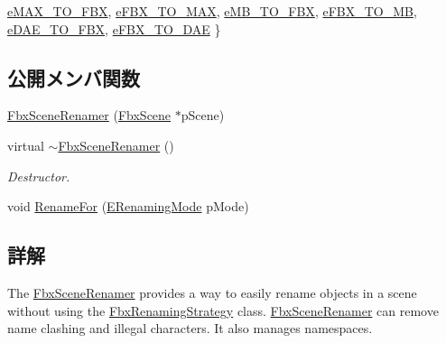 \begin{DoxyCompactItemize}
\newline
\hyperlink{class_fbx_scene_renamer_a9279ee1a645d6499b934adbc376f8678a78cd01354aa873a50104cacfc3f15ee1}{e\+M\+A\+X\+\_\+\+T\+O\+\_\+\+F\+BX}, 
\hyperlink{class_fbx_scene_renamer_a9279ee1a645d6499b934adbc376f8678ad35417f5b8fa1aebae49dd0b5768361e}{e\+F\+B\+X\+\_\+\+T\+O\+\_\+\+M\+AX}, 
\hyperlink{class_fbx_scene_renamer_a9279ee1a645d6499b934adbc376f8678a1ccbaac20ac59c6a17b02080b5b2ce42}{e\+M\+B\+\_\+\+T\+O\+\_\+\+F\+BX}, 
\hyperlink{class_fbx_scene_renamer_a9279ee1a645d6499b934adbc376f8678a4b2ce21a08c3ca1b33561dc9af4db009}{e\+F\+B\+X\+\_\+\+T\+O\+\_\+\+MB}, 
\newline
\hyperlink{class_fbx_scene_renamer_a9279ee1a645d6499b934adbc376f8678aeaaa82337096e368fac6bd8540b91d9e}{e\+D\+A\+E\+\_\+\+T\+O\+\_\+\+F\+BX}, 
\hyperlink{class_fbx_scene_renamer_a9279ee1a645d6499b934adbc376f8678a60b9c2ff84f2c16aa1311608b96c198e}{e\+F\+B\+X\+\_\+\+T\+O\+\_\+\+D\+AE}
 \}
\end{DoxyCompactItemize}
\subsection*{公開メンバ関数}
\begin{DoxyCompactItemize}
\item 
\hyperlink{class_fbx_scene_renamer_acb44c3ef9f338d6f55b57882505d9edb}{Fbx\+Scene\+Renamer} (\hyperlink{class_fbx_scene}{Fbx\+Scene} $\ast$p\+Scene)
\item 
virtual \hyperlink{class_fbx_scene_renamer_a68ee26ac24c461b9b11085feec2094f4}{$\sim$\+Fbx\+Scene\+Renamer} ()
\begin{DoxyCompactList}\small\item\em Destructor. \end{DoxyCompactList}\item 
void \hyperlink{class_fbx_scene_renamer_a08a9c3b587efe5422bd5b79f01b42e6d}{Rename\+For} (\hyperlink{class_fbx_scene_renamer_a9279ee1a645d6499b934adbc376f8678}{E\+Renaming\+Mode} p\+Mode)
\end{DoxyCompactItemize}


\subsection{詳解}
The \hyperlink{class_fbx_scene_renamer}{Fbx\+Scene\+Renamer} provides a way to easily rename objects in a scene without using the \hyperlink{class_fbx_renaming_strategy}{Fbx\+Renaming\+Strategy} class. \hyperlink{class_fbx_scene_renamer}{Fbx\+Scene\+Renamer} can remove name clashing and illegal characters. It also manages namespaces.

